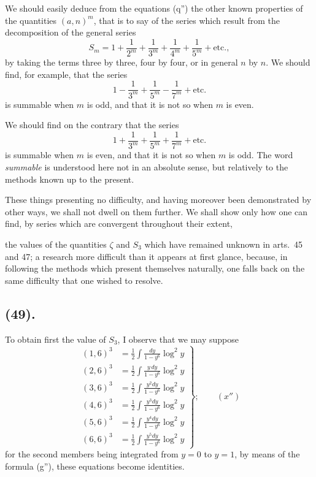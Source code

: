 \documentclass{article}
\begin{document}
We should easily deduce from the equations (q'') the other known properties of the quantities $(a,n)^{m}$, that is to say of the series which result from the decomposition of the general series
\[ S_{m}=1+\frac{1}{2^{m}}+\frac{1}{3^{m}}+\frac{1}{4^{m}}+\frac{1}{5^{m}}+\text{etc.}, \]
by taking the terms three by three, four by four, or in general $n$ by $n$. We should find, for example, that the series
\[ 1-\frac{1}{3^{m}}+\frac{1}{5^{m}}-\frac{1}{7^{m}}+\text{etc.} \]
is summable when $m$ is odd, and that it is not so when $m$ is even.

We should find on the contrary that the series
\[ 1+\frac{1}{3^{m}}+\frac{1}{5^{m}}+\frac{1}{7^{m}}+\text{etc.} \]
is summable when $m$ is even, and that it is not so when $m$ is odd. The word \emph{summable} is understood here not in an absolute sense, but relatively to the methods known up to the present.

These things presenting no difficulty, and having moreover been demonstrated by other ways, we shall not dwell on them further. We shall show only how one can find, by series which are convergent throughout their extent,

the values of the quantities $\zeta$ and $S_{3}$ which have remained unknown in arts.\ 45 and 47; a research more difficult than it appears at first glance, because, in following the methods which present themselves naturally, one falls back on the same difficulty that one wished to resolve.

\subsection*{(49).}

To obtain first the value of $S_{3}$, I observe that we may suppose
\[ \left.\begin{aligned} (1,6)^{3}&=\frac{1}{2}\int\frac{dy}{1-y^{6}}\log^{2}y\\ (2,6)^{3}&=\frac{1}{2}\int\frac{y\,dy}{1-y^{6}}\log^{2}y\\ (3,6)^{3}&=\frac{1}{2}\int\frac{y^{2}dy}{1-y^{6}}\log^{2}y\\ (4,6)^{3}&=\frac{1}{2}\int\frac{y^{3}dy}{1-y^{6}}\log^{2}y\\ (5,6)^{3}&=\frac{1}{2}\int\frac{y^{4}dy}{1-y^{6}}\log^{2}y\\ (6,6)^{3}&=\frac{1}{2}\int\frac{y^{5}dy}{1-y^{6}}\log^{2}y \end{aligned}\right\};\qquad(x'') \]
for the second members being integrated from $y=0$ to $y=1$, by means of the formula (g''), these equations become identities.
\end{document}
